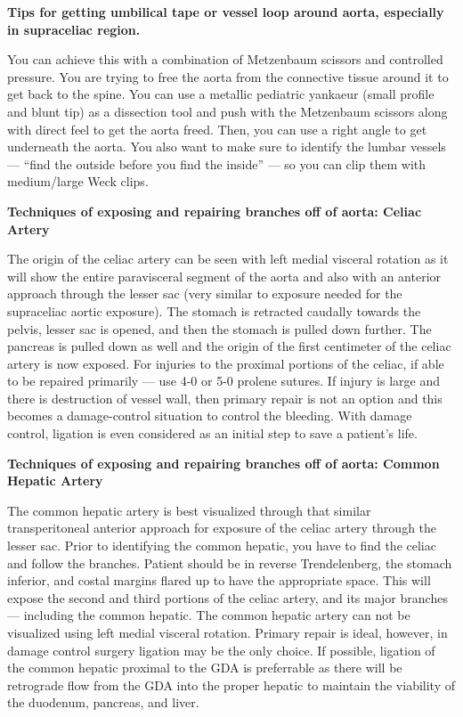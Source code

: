 \documentclass[
]{book}
\begin{document}
\textbf{Tips for getting umbilical tape or vessel loop around aorta,
especially in supraceliac region.}

You can achieve this with a combination of Metzenbaum scissors and
controlled pressure. You are trying to free the aorta from the
connective tissue around it to get back to the spine. You can use a
metallic pediatric yankaeur (small profile and blunt tip) as a
dissection tool and push with the Metzenbaum scissors along with direct
feel to get the aorta freed. Then, you can use a right angle to get
underneath the aorta. You also want to make sure to identify the lumbar
vessels --- ``find the outside before you find the inside'' --- so you can
clip them with medium/large Weck clips.

\textbf{Techniques of exposing and repairing branches off of aorta: Celiac
Artery}

The origin of the celiac artery can be seen with left medial visceral
rotation as it will show the entire paravisceral segment of the aorta
and also with an anterior approach through the lesser sac (very similar
to exposure needed for the supraceliac aortic exposure). The stomach is
retracted caudally towards the pelvis, lesser sac is opened, and then
the stomach is pulled down further. The pancreas is pulled down as well
and the origin of the first centimeter of the celiac artery is now
exposed. For injuries to the proximal portions of the celiac, if able to
be repaired primarily --- use 4-0 or 5-0 prolene sutures. If injury is
large and there is destruction of vessel wall, then primary repair is
not an option and this becomes a damage-control situation to control the
bleeding. With damage control, ligation is even considered as an initial
step to save a patient's life.

\textbf{Techniques of exposing and repairing branches off of aorta: Common
Hepatic Artery}

The common hepatic artery is best visualized through that similar
transperitoneal anterior approach for exposure of the celiac artery
through the lesser sac. Prior to identifying the common hepatic, you
have to find the celiac and follow the branches. Patient should be in
reverse Trendelenberg, the stomach inferior, and costal margins flared
up to have the appropriate space. This will expose the second and third
portions of the celiac artery, and its major branches --- including the
common hepatic. The common hepatic artery can not be visualized using
left medial visceral rotation. Primary repair is ideal, however, in
damage control surgery ligation may be the only choice. If possible,
ligation of the common hepatic proximal to the GDA is preferrable as
there will be retrograde flow from the GDA into the proper hepatic to
maintain the viability of the duodenum, pancreas, and liver.
\end{document}
